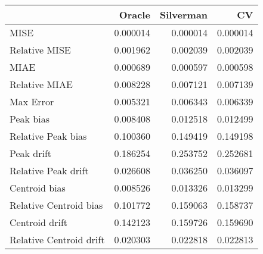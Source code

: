 \begin{tabular}{lrrr}
  \hline
 & Oracle & Silverman & CV \\ 
  \hline
MISE & 0.000014 & 0.000014 & 0.000014 \\ 
  Relative MISE & 0.001962 & 0.002039 & 0.002039 \\ 
  MIAE & 0.000689 & 0.000597 & 0.000598 \\ 
  Relative MIAE & 0.008228 & 0.007121 & 0.007139 \\ 
  Max Error & 0.005321 & 0.006343 & 0.006339 \\ 
  Peak bias & 0.008408 & 0.012518 & 0.012499 \\ 
  Relative Peak bias & 0.100360 & 0.149419 & 0.149198 \\ 
  Peak drift & 0.186254 & 0.253752 & 0.252681 \\ 
  Relative Peak drift & 0.026608 & 0.036250 & 0.036097 \\ 
  Centroid bias & 0.008526 & 0.013326 & 0.013299 \\ 
  Relative Centroid bias & 0.101772 & 0.159063 & 0.158737 \\ 
  Centroid drift & 0.142123 & 0.159726 & 0.159690 \\ 
  Relative Centroid drift & 0.020303 & 0.022818 & 0.022813 \\ 
   \hline
\end{tabular}
